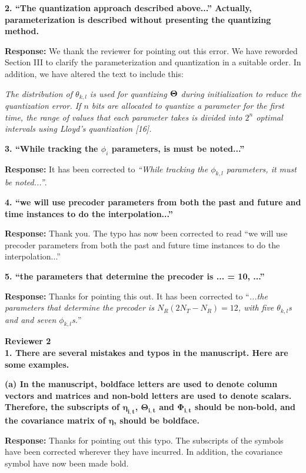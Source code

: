 \documentclass[12pt]{letter}
\begin{document}
\textbf{2. ``The quantization approach described above...'' Actually,
  parameterization is described without presenting the quantizing
  method.}

\textbf{Response:} We thank the reviewer for pointing out this
error. We have reworded Section III to clarify the parameterization and quantization
in a suitable order. In addition, we have altered the text to include this:

\emph{The distribution of $\theta_{k,l}$ is used for
quantizing $\bf{\Theta}$ during initialization to reduce the
quantization error.  If $n$ bits are allocated to quantize a
parameter for the first time, the range of values that each parameter
takes is divided into $2^n$ optimal intervals using Lloyd's
quantization [16].}

\textbf{3. ``While tracking the $\phi_i$ parameters, is must be noted...''}

\textbf{Response:} It has been corrected to \emph{``While tracking the $\phi_{k,l}$ parameters, it must be noted...''}.

\textbf{4. ``we will use precoder parameters from both the past and future and
time instances to do the interpolation...''}

\textbf{Response:} Thank you. The typo has now been corrected to read
``we will use precoder parameters from both the past and future time instances to do the interpolation...''

\textbf{5. ``the parameters that determine the precoder is ...  = 10, ...''}

\textbf{Response:} Thanks for pointing this out. It has been corrected to ``\emph{...the parameters that determine the precoder is
$N_{R}(2N_{T} - N_R) = 12$, with five $\theta_{k,l}$s and and seven
$\phi_{k,l}$s.}''

\textbf{Reviewer 2}\\

\textbf{1. There are several mistakes and typos in the manuscript. Here are some examples.}

\textbf{(a) In the manuscript, boldface letters are used to denote column vectors and matrices and non-bold letters are used to denote scalars. Therefore, the subscripts of $\boldsymbol{\eta_{i,t}}$, $\boldsymbol{\Theta_{i,t}}$ and $\boldsymbol{\Phi_{i,t}}$ should be non-bold, and the covariance matrix of $\boldsymbol{\eta}$, should be boldface.}

\textbf{Response:} Thanks for pointing out this typo. The subscripts
of the symbols have been corrected wherever they have incurred. In addition,
the covariance symbol have now been made bold.
\end{document}

